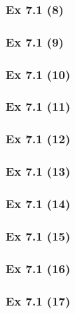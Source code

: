 \subsubsection{Ex 7.1 (8)}\label{sec:Ex_7.1.8}

\subsubsection{Ex 7.1 (9)}\label{sec:Ex_7.1.9}

\subsubsection{Ex 7.1 (10)}\label{sec:Ex_7.1.10}

\newpage		%

\subsubsection{Ex 7.1 (11)}\label{sec:Ex_7.1.11}

\subsubsection{Ex 7.1 (12)}\label{sec:Ex_7.1.12}

\subsubsection{Ex 7.1 (13)}\label{sec:Ex_7.1.13}

\subsubsection{Ex 7.1 (14)}\label{sec:Ex_7.1.14}

\subsubsection{Ex 7.1 (15)}\label{sec:Ex_7.1.15}

\subsubsection{Ex 7.1 (16)}\label{sec:Ex_7.1.16}

\subsubsection{Ex 7.1 (17)}\label{sec:Ex_7.1.17}

